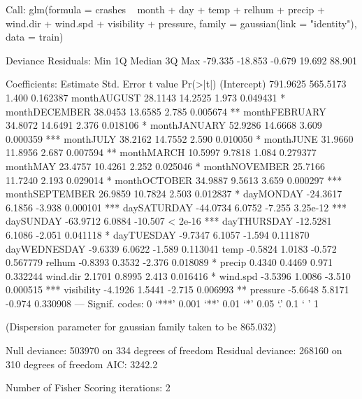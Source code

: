 \documentclass[11pt, a4paper]{article}
\begin{document}
\begin{Schunk}
\begin{Soutput}
Call:
glm(formula = crashes ~ month + day + temp + relhum + precip + 
    wind.dir + wind.spd + visibility + pressure, family = gaussian(link = "identity"), 
    data = train)

Deviance Residuals: 
    Min       1Q   Median       3Q      Max  
-79.335  -18.853   -0.679   19.692   88.901  

Coefficients:
               Estimate Std. Error t value Pr(>|t|)    
(Intercept)    791.9625   565.5173   1.400 0.162387    
monthAUGUST     28.1143    14.2525   1.973 0.049431 *  
monthDECEMBER   38.0453    13.6585   2.785 0.005674 ** 
monthFEBRUARY   34.8072    14.6491   2.376 0.018106 *  
monthJANUARY    52.9286    14.6668   3.609 0.000359 ***
monthJULY       38.2162    14.7552   2.590 0.010050 *  
monthJUNE       31.9660    11.8956   2.687 0.007594 ** 
monthMARCH      10.5997     9.7818   1.084 0.279377    
monthMAY        23.4757    10.4261   2.252 0.025046 *  
monthNOVEMBER   25.7166    11.7240   2.193 0.029014 *  
monthOCTOBER    34.9887     9.5613   3.659 0.000297 ***
monthSEPTEMBER  26.9859    10.7824   2.503 0.012837 *  
dayMONDAY      -24.3617     6.1856  -3.938 0.000101 ***
daySATURDAY    -44.0734     6.0752  -7.255 3.25e-12 ***
daySUNDAY      -63.9712     6.0884 -10.507  < 2e-16 ***
dayTHURSDAY    -12.5281     6.1086  -2.051 0.041118 *  
dayTUESDAY      -9.7347     6.1057  -1.594 0.111870    
dayWEDNESDAY    -9.6339     6.0622  -1.589 0.113041    
temp            -0.5824     1.0183  -0.572 0.567779    
relhum          -0.8393     0.3532  -2.376 0.018089 *  
precip           0.4340     0.4469   0.971 0.332244    
wind.dir         2.1701     0.8995   2.413 0.016416 *  
wind.spd        -3.5396     1.0086  -3.510 0.000515 ***
visibility      -4.1926     1.5441  -2.715 0.006993 ** 
pressure        -5.6648     5.8171  -0.974 0.330908    
---
Signif. codes:  0 ‘***’ 0.001 ‘**’ 0.01 ‘*’ 0.05 ‘.’ 0.1 ‘ ’ 1

(Dispersion parameter for gaussian family taken to be 865.032)

    Null deviance: 503970  on 334  degrees of freedom
Residual deviance: 268160  on 310  degrees of freedom
AIC: 3242.2

Number of Fisher Scoring iterations: 2
\end{Soutput}
\end{Schunk}
\end{document}
